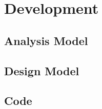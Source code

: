 \documentclass[pdflatex,a4paper,11pt,english]{scrreprt}
\begin{document}
\chapter{Development}




\section{Analysis Model}


\section{Design Model}

\section{Code}
\end{document}
